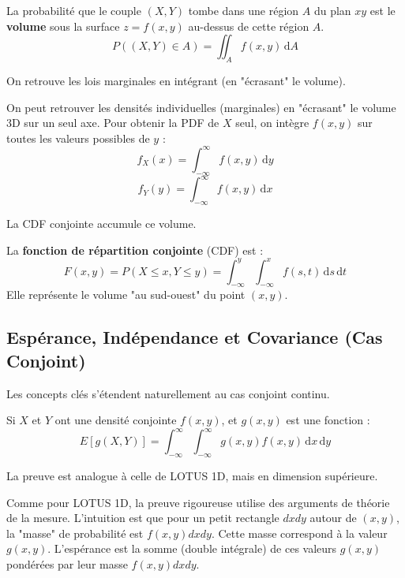 \begin{intuitionbox}[Volume = Probabilité]
La probabilité que le couple $(X, Y)$ tombe dans une région $A$ du plan $xy$ est le \textbf{volume} sous la surface $z=f(x,y)$ au-dessus de cette région $A$.
$$ P((X, Y) \in A) = \iint_A f(x, y) \, \mathrm{d}A $$

\end{intuitionbox}

On retrouve les lois marginales en intégrant (en "écrasant" le volume).

\begin{definitionbox}
On peut retrouver les densités individuelles (marginales) en "écrasant" le volume 3D sur un seul axe. Pour obtenir la PDF de $X$ seul, on intègre $f(x,y)$ sur toutes les valeurs possibles de $y$ :
$$ f_X(x) = \int_{-\infty}^{\infty} f(x, y) \, \mathrm{d}y $$
$$ f_Y(y) = \int_{-\infty}^{\infty} f(x, y) \, \mathrm{d}x $$
\end{definitionbox}

La CDF conjointe accumule ce volume.

\begin{definitionbox}
La \textbf{fonction de répartition conjointe} (CDF) est :
$$ F(x, y) = P(X \le x, Y \le y) = \int_{-\infty}^y \int_{-\infty}^x f(s, t) \, \mathrm{d}s \, \mathrm{d}t $$
Elle représente le volume "au sud-ouest" du point $(x, y)$.
\end{definitionbox}

\subsection{Espérance, Indépendance et Covariance (Cas Conjoint)}

Les concepts clés s'étendent naturellement au cas conjoint continu.

\begin{theorembox}
Si $X$ et $Y$ ont une densité conjointe $f(x, y)$, et $g(x, y)$ est une fonction :
$$ E[g(X, Y)] = \int_{-\infty}^{\infty} \int_{-\infty}^{\infty} g(x, y) f(x, y) \, \mathrm{d}x \, \mathrm{d}y $$
\end{theorembox}

La preuve est analogue à celle de LOTUS 1D, mais en dimension supérieure.

\begin{proofbox}
Comme pour LOTUS 1D, la preuve rigoureuse utilise des arguments de théorie de la mesure. L'intuition est que pour un petit rectangle $dx dy$ autour de $(x,y)$, la "masse" de probabilité est $f(x,y)dx dy$. Cette masse correspond à la valeur $g(x,y)$. L'espérance est la somme (double intégrale) de ces valeurs $g(x,y)$ pondérées par leur masse $f(x,y)dx dy$.
\end{proofbox}

